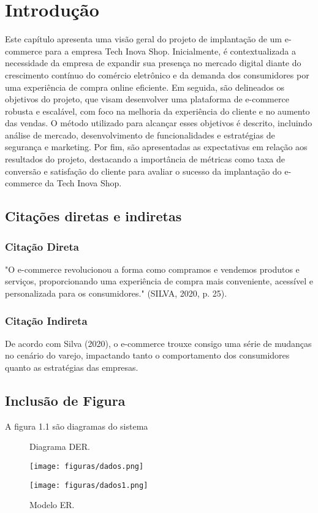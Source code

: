 \chapter{Introdução}
\label{ch:introducao}
\begin{resumocapitulo}
	Este capítulo apresenta uma visão geral do projeto de implantação de um e-commerce para a empresa Tech Inova Shop. Inicialmente, é contextualizada a necessidade da empresa de expandir sua presença no mercado digital diante do crescimento contínuo do comércio eletrônico e da demanda dos consumidores por uma experiência de compra online eficiente. Em seguida, são delineados os objetivos do projeto, que visam desenvolver uma plataforma de e-commerce robusta e escalável, com foco na melhoria da experiência do cliente e no aumento das vendas. O método utilizado para alcançar esses objetivos é descrito, incluindo análise de mercado, desenvolvimento de funcionalidades e estratégias de segurança e marketing. Por fim, são apresentadas as expectativas em relação aos resultados do projeto, destacando a importância de métricas como taxa de conversão e satisfação do cliente para avaliar o sucesso da implantação do e-commerce da Tech Inova Shop.
\end{resumocapitulo}

\section{Citações diretas e indiretas}
\label{sec:citacoes}
\subsection{Citação Direta}
\label{subsec:citacao_direta}
"O e-commerce revolucionou a forma como compramos e vendemos produtos e serviços, proporcionando uma experiência de compra mais conveniente, acessível e personalizada para os consumidores." (SILVA, 2020, p. 25).

\subsection{Citação Indireta}
\label{subsec:citacao_indireta}
De acordo com Silva (2020), o e-commerce trouxe consigo uma série de mudanças no cenário do varejo, impactando tanto o comportamento dos consumidores quanto as estratégias das empresas.
\section{Inclusão de Figura}
\label{sec:figura}
A figura 1.1 são diagramas do sistema
\begin{figure}[!ht]
	{\centering
		\caption{Diagrama DER.}
		
  \texttt{[image: figuras/dados.png]}
  
  \caption{Modelo ER.}
  \texttt{[image: figuras/dados1.png]}
		\label{fig:identificador_da_figura}
	}
\end{figure}

